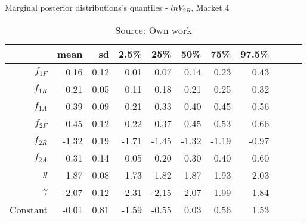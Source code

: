 \begin{table}[H]
\caption{Marginal posterior distributions's quantiles - $ln V_{2R}$,  Market 4}
\centering
\begin{tabular}{rrrrrrrrrrr}
  \toprule
         & mean   & sd   & 2.5\% & 25\%  & 50\%  & 75\%  & 97.5\%\\ 
  \hline
  $f_{1F}$ & 0.16  & 0.12 & 0.01  & 0.07  & 0.14  & 0.23  & 0.43 \\ 
  $f_{1R}$ & 0.21  & 0.05 & 0.11  & 0.18  & 0.21  & 0.25  & 0.32 \\ 
  $f_{1A}$ & 0.39  & 0.09 & 0.21  & 0.33  & 0.40  & 0.45  & 0.56 \\ 
  $f_{2F}$ & 0.45  & 0.12 & 0.22  & 0.37  & 0.45  & 0.53  & 0.66 \\ 
  $f_{2R}$ & -1.32 & 0.19 & -1.71 & -1.45 & -1.32 & -1.19 & -0.97\\ 
  $f_{2A}$ & 0.31  & 0.14 & 0.05  & 0.20  & 0.30  & 0.40  & 0.60 \\ 
  $g$      & 1.87  & 0.08 & 1.73  & 1.82  & 1.87  & 1.93  & 2.03 \\ 
  $\gamma$ & -2.07 & 0.12 & -2.31 & -2.15 & -2.07 & -1.99 & -1.84\\ 
  Constant & -0.01 & 0.81 & -1.59 & -0.55 & 0.03  & 0.56  & 1.53 \\ 
     \bottomrule
\end{tabular}
\caption*{Source: Own work}
\end{table}
